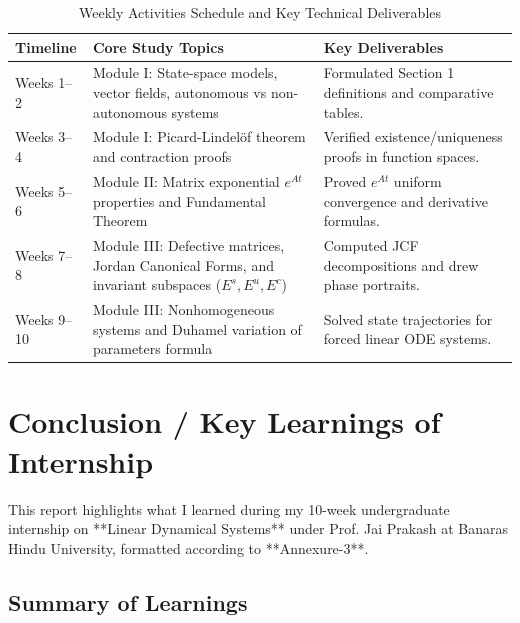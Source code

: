 \documentclass[12pt,a4paper,oneside]{article}
\theoremstyle{definition}
\theoremstyle{plain}
\begin{document}
\begin{table}[htbp]
    \centering
    \caption{Weekly Activities Schedule and Key Technical Deliverables}
    \label{tab:internship_activities_human_v8}
    \small
    \begin{tabular}{p{2.0cm} p{7.5cm} p{5.5cm}}
        \toprule
        \textbf{Timeline} & \textbf{Core Study Topics} & \textbf{Key Deliverables} \\
        \midrule
        Weeks 1--2 & Module I: State-space models, vector fields, autonomous vs non-autonomous systems & Formulated Section 1 definitions and comparative tables. \\
        Weeks 3--4 & Module I: Picard-Lindelöf theorem and contraction proofs & Verified existence/uniqueness proofs in function spaces. \\
        Weeks 5--6 & Module II: Matrix exponential $e^{At}$ properties and Fundamental Theorem & Proved $e^{At}$ uniform convergence and derivative formulas. \\
        Weeks 7--8 & Module III: Defective matrices, Jordan Canonical Forms, and invariant subspaces ($E^s, E^u, E^c$) & Computed JCF decompositions and drew phase portraits. \\
        Weeks 9--10 & Module III: Nonhomogeneous systems and Duhamel variation of parameters formula & Solved state trajectories for forced linear ODE systems. \\
        \bottomrule
    \end{tabular}
\end{table}

\newpage
\section{Conclusion / Key Learnings of Internship}
\label{sec:conclusion}

This report highlights what I learned during my 10-week undergraduate internship on **Linear Dynamical Systems** under Prof. Jai Prakash at Banaras Hindu University, formatted according to **Annexure-3**.

\subsection{Summary of Learnings}
\end{document}
